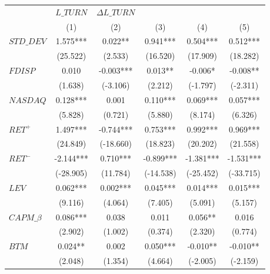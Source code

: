 \documentclass[
  12pt,
  a4paper,
  twoside,
  onecolumn]{article}
\begin{document}
\begin{spacing}{1.0}
\begin{table}
\begin{tabularx}{\linewidth}{X * {5}{S[table-format=4.3]}}
 &  &  &  &  &  \\
\cmidrule(l{3pt}r{3pt}){2-2} \cmidrule(l{3pt}r{3pt}){3-3} \cmidrule(l{3pt}r{3pt}){4-4} \cmidrule(l{3pt}r{3pt}){5-5} \cmidrule(l{3pt}r{3pt}){6-6}
 & {(1)} & {(2)} & {(3)} & {(4)} & {(5)}\\
\midrule
$STD\_DEV$ & 1.575*** & 0.022** & 0.941*** & 0.504*** & 0.512***\\
 & (25.522) & (2.533) & (16.520) & (17.909) & (18.282)\\
\addlinespace
$FDISP$ & 0.010 & -0.003*** & 0.013** & -0.006* & -0.008**\\
 & (1.638) & (-3.106) & (2.212) & (-1.797) & (-2.311)\\
\addlinespace
$NASDAQ$ & 0.128*** & 0.001 & 0.110*** & 0.069*** & 0.057***\\
 & (5.828) & (0.721) & (5.880) & (8.174) & (6.326)\\
\addlinespace
$RET^+$ & 1.497*** & -0.744*** & 0.753*** & 0.992*** & 0.969***\\
 & (24.849) & (-18.660) & (18.823) & (20.202) & (21.558)\\
\addlinespace
$RET^-$ & -2.144*** & 0.710*** & -0.899*** & -1.381*** & -1.531***\\
 & (-28.905) & (11.784) & (-14.538) & (-25.452) & (-33.715)\\
\addlinespace
$LEV$ & 0.062*** & 0.002*** & 0.045*** & 0.014*** & 0.015***\\
 & (9.116) & (4.064) & (7.405) & (5.091) & (5.157)\\
\addlinespace
$CAPM\_\beta$ & 0.086*** & 0.038 & 0.011 & 0.056** & 0.016\\
 & (2.902) & (1.002) & (0.374) & (2.320) & (0.774)\\
\addlinespace
$BTM$ & 0.024** & 0.002 & 0.050*** & -0.010** & -0.010**\\
 & (2.048) & (1.354) & (4.664) & (-2.005) & (-2.159)\\

\end{tabularx}
\end{table}
\end{spacing}
\end{document}
